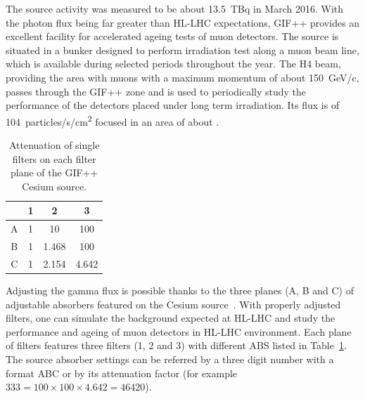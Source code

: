 	The source activity was measured to be about \SI{13.5}{TBq} in March 2016. With the photon flux being far greater than HL-LHC expectations, GIF++ provides an excellent facility for accelerated ageing tests of muon detectors. The source is situated in a bunker designed to perform irradiation test along a muon beam line, which is available during selected periods throughout the year. The H4 beam, providing the area with muons with a maximum momentum of about \SI{150}{GeV/c}, passes through the GIF++ zone and is used to periodically study the performance of the detectors placed under long term irradiation. Its flux is of \SI{104}{particles/s/\square\cm} focused in an area of about .
	
\begingroup\setlength{\intextsep}{0pt}\setlength{\columnsep}{15pt}
	
	\begin{table}
		\centering
		\begin{tabular}{c|c|c|c|}
		\cline{2-4}
		 & 1 & 2 & 3 \\
		\hline
		\multicolumn{1}{|c|}{A} & 1 & 10 & 100\\
		\hline
		\multicolumn{1}{|c|}{B} & 1 & 1.468 & 100\\
		\hline
		\multicolumn{1}{|c|}{C} & 1 & 2.154 & 4.642\\
		\hline
		\end{tabular}
		\caption{\label{tab:ABS-GIFpp} Attenuation of single filters on each filter plane of the GIF++ Cesium source.}
	\end{table}
	 
	Adjusting the gamma flux is possible thanks to the three planes (A, B and C) of adjustable absorbers featured on the Cesium source~\cite{GIFFILTERS}. With properly adjusted filters, one can simulate the background expected at HL-LHC and study the performance and ageing of muon detectors in HL-LHC environment. Each plane of filters features three filters (1, 2 and 3) with different \acf{ABS} listed in Table~\ref{tab:ABS-GIFpp}. The source absorber settings can be referred by a three digit number with a format ABC or by its attenuation factor (for example $333 = 100\times 100 \times 4.642 = 46420$).
	
\endgroup
	
